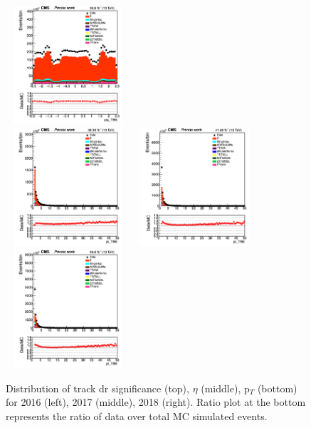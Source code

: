 \documentclass{cernatlasnote}
\begin{document}
\begin{figure}[htp]
 \includegraphics[width=4.6cm, height=4.4cm]{images/emu_channel/2018/18_Range_0pt2_1pt8/track_eta_TRK_Linear.png}\\
\includegraphics[width=4.6cm, height=4.4cm]{images/emu_channel/2016/16_Range_0pt2_1pt8/track_pt_TRK_Linear.png}
\includegraphics[width=4.6cm, height=4.4cm]{images/emu_channel/2017/17_Range_0pt2_1pt8/track_pt_TRK_Linear.png}
 \includegraphics[width=4.6cm, height=4.4cm]{images/emu_channel/2018/18_Range_0pt2_1pt8/track_pt_TRK_Linear.png}\\
  \caption{Distribution of track dr significance (top), $\eta$ (middle), p$_{T}$ (bottom) for 2016 (left), 2017 (middle), 2018 (right). Ratio plot at the bottom represents the ratio of data over total MC simulated events.}
 \label{fig:L0DATAMC}
  \end{figure}
\end{document}
